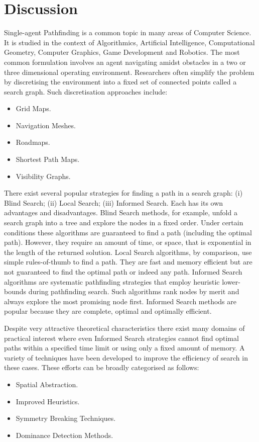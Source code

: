 \section{Discussion}
\label{cha::lit::discussion}
Single-agent Pathfinding is a common topic in many areas of Computer Science. It is studied in the
context of Algorithmics, Artificial Intelligence, Computational Geometry, Computer Graphics, Game
Development and Robotics.  The most common formulation involves an agent navigating amidst obstacles
in a two or three dimensional operating environment.  Researchers often simplify the problem by
discretising the environment into a fixed set of connected points called a search graph. Such
discretisation approaches include:
\begin{itemize}
\item Grid Maps.
\item Navigation Meshes.
\item Roadmaps.
\item Shortest Path Maps.
\item Visibility Graphs.
\end{itemize}

There exist several popular strategies for finding a path in a search graph: (i)
Blind Search; (ii) Local Search; (iii) Informed Search. Each has its own advantages and 
disadvantages. Blind Search methods, for example, unfold a search graph into a tree and
explore the nodes in a fixed order. Under certain conditions these algorithms are 
guaranteed to find a path (including the optimal path). However, they
require an amount of time, or space, that is exponential in the length of the returned 
solution.
Local Search algorithms, by comparison, use simple rules-of-thumb to find a path.
They are fast and memory efficient but are not guaranteed to find the optimal 
path or indeed any path.
Informed Search algorithms are systematic pathfinding strategies that employ heuristic
lower-bounds during pathfinding search. Such algorithms rank 
nodes by merit and always explore the most promising node first. Informed Search methods
are popular because they are complete, optimal and optimally efficient. 

Despite very attractive theoretical characteristics there exist many domains of practical 
interest where even Informed Search strategies cannot find optimal paths within a specified
time limit or using only a fixed amount of memory. A variety of techniques have been
developed to improve the efficiency of search in these cases. These efforts can be broadly 
categorised as follows:
\begin{itemize}
\item Spatial Abstraction.
\item Improved Heuristics.
\item Symmetry Breaking Techniques.
\item Dominance Detection Methods.
\end{itemize}

